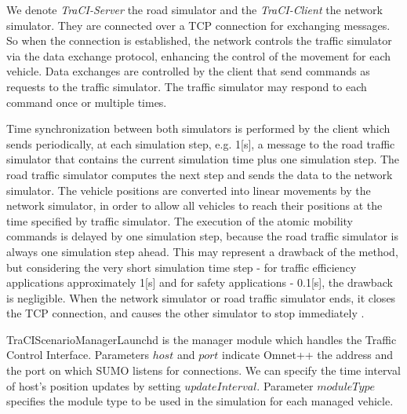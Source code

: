 We denote {\it TraCI-Server} the road simulator and the {\it TraCI-Client} the
network simulator. They are connected over a TCP connection for exchanging
messages. So when the connection is established, the network controls the
traffic simulator via the data exchange protocol, enhancing the control of the
movement for each vehicle. Data exchanges are controlled by the client that
send commands as requests to the traffic simulator. The traffic simulator
may respond to each command once or multiple times.

Time synchronization between both simulators is performed by the client which
sends periodically, at each simulation step, e.g. 1[s], a message to the road
traffic simulator that contains the current simulation time plus one simulation
step. The road traffic simulator computes the next step and sends the data to
the network simulator. The vehicle positions are converted into linear movements
by the network simulator, in order to allow all vehicles to reach their
positions at the time specified by traffic simulator. The execution of the
atomic mobility commands is delayed by one simulation step, because the road
traffic simulator is always one simulation step ahead. This may represent a
drawback of the method, but considering the very short simulation time step -
for traffic efficiency applications approximately 1[s] and for safety
applications - 0.1[s], the drawback is negligible. When the network simulator or
road traffic simulator ends, it closes the TCP connection, and causes the other
simulator to stop immediately \cite{traci_interface}.

TraCIScenarioManagerLaunchd is the manager module which handles the Traffic
Control Interface. Parameters $host$ and $port$ indicate Omnet++ the address and
the port on which SUMO listens for connections. We can specify the time interval
of host's position updates by setting $updateInterval$. Parameter $moduleType$
specifies the module type to be used in the simulation for each managed vehicle.

